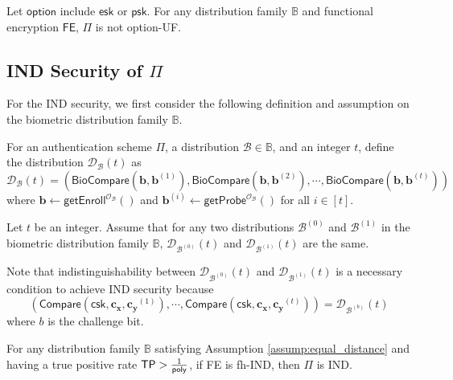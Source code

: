 \begin{theorem}

Let $\textsf{option}$ include $\textsf{esk}$ or $\textsf{psk}$. For any distribution family $\mathbb{B}$ and functional encryption $\textsf{FE}$, $\Pi$ is not \textsf{option}-UF.

\end{theorem}




\subsection{IND Security of $\Pi$}
\label{sec:security_analysis:fh-IPFE:IND}

For the IND security, we first consider the following definition and assumption on the biometric distribution family $\mathbb{B}$.

\begin{definition}
For an authentication scheme $\Pi$, a distribution $\mathcal{B} \in \mathbb{B}$, and an integer $t$, define the distribution $\mathcal{D}_\mathcal{B}(t)$ as
\[
	\mathcal{D}_\mathcal{B}(t) = \left( \textsf{BioCompare}(\mathbf{b}, \mathbf{b}^{(1)}), \textsf{BioCompare}(\mathbf{b}, \mathbf{b}^{(2)}), \cdots, \textsf{BioCompare}(\mathbf{b}, \mathbf{b}^{(t)}) \right)
\]
where $\mathbf{b} \gets \textsf{getEnroll}^{\mathcal{O}_\mathcal{B}}()$ and $ \mathbf{b}^{(i)} \gets \textsf{getProbe}^{\mathcal{O}_\mathcal{B}}()$ for all $i \in [t]$.

\end{definition}

\begin{assumption}
\label{assump:equal_distance}
Let $t$ be an integer. Assume that for any two distributions $\mathcal{B}^{(0)}$ and $\mathcal{B}^{(1)}$ in the biometric distribution family $\mathbb{B}$, $\mathcal{D}_{ \mathcal{B}^{(0)} }(t)$ and $\mathcal{D}_{ \mathcal{B}^{(1)} }(t)$ are the same. 

\end{assumption}

Note that indistinguishability between $\mathcal{D}_{ \mathcal{B}^{(0)} }(t)$ and $\mathcal{D}_{ \mathcal{B}^{(1)} }(t)$ is a necessary condition to achieve IND security because
\[
	\left( \textsf{Compare}(\textsf{csk}, \mathbf{c_x}, \mathbf{c_y}^{(1)}), \cdots, \textsf{Compare}(\textsf{csk}, \mathbf{c_x}, \mathbf{c_y}^{(t)}) \right) = \mathcal{D}_{ \mathcal{B}^{(b)} }(t)
\]
where $b$ is the challenge bit.


\begin{theorem}
\label{thm:fh-IPFE:ind-ind}
For any distribution family $\mathbb{B}$ satisfying Assumption \ref{assump:equal_distance} and having a true positive rate $\textsf{TP} > \frac{1}{\mathsf{poly}}$, if \textsf{FE} is fh-IND, then $\Pi$ is IND.

\end{theorem}



